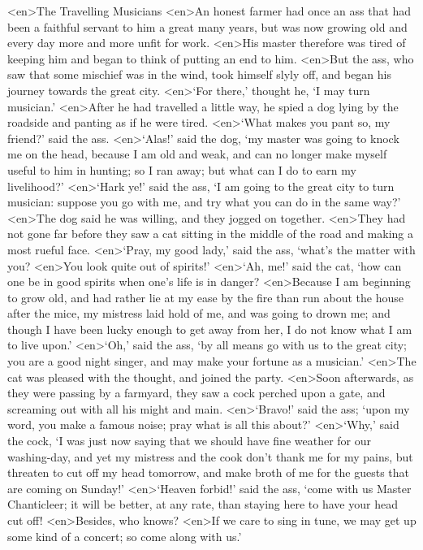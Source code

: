 <en>The Travelling Musicians 
<en>An honest farmer had once an ass that had been a faithful servant to him a great many years, but was now growing old and every day more and more unfit for work.
<en>His master therefore was tired of keeping him and began to think of putting an end to him.
<en>But the ass, who saw that some mischief was in the wind, took himself slyly off, and began his journey towards the great city.
<en>‘For there,’ thought he, ‘I may turn musician.’ 
<en>After he had travelled a little way, he spied a dog lying by the roadside and panting as if he were tired.
<en>‘What makes you pant so, my friend?’ said the ass.
<en>‘Alas!’ said the dog, ‘my master was going to knock me on the head, because I am old and weak, and can no longer make myself useful to him in hunting; so I ran away; but what can I do to earn my livelihood?’ 
<en>‘Hark ye!’ said the ass, ‘I am going to the great city to turn musician: suppose you go with me, and try what you can do in the same way?’ 
<en>The dog said he was willing, and they jogged on together.
<en>They had not gone far before they saw a cat sitting in the middle of the road and making a most rueful face.
<en>‘Pray, my good lady,’ said the ass, ‘what’s the matter with you?
<en>You look quite out of spirits!’ 
<en>‘Ah, me!’ said the cat, ‘how can one be in good spirits when one’s life is in danger?
<en>Because I am beginning to grow old, and had rather lie at my ease by the fire than run about the house after the mice, my mistress laid hold of me, and was going to drown me; and though I have been lucky enough to get away from her, I do not know what I am to live upon.’ 
<en>‘Oh,’ said the ass, ‘by all means go with us to the great city; you are a good night singer, and may make your fortune as a musician.’ 
<en>The cat was pleased with the thought, and joined the party.
<en>Soon afterwards, as they were passing by a farmyard, they saw a cock perched upon a gate, and screaming out with all his might and main.
<en>‘Bravo!’ said the ass; ‘upon my word, you make a famous noise; pray what is all this about?’ 
<en>‘Why,’ said the cock, ‘I was just now saying that we should have fine weather for our washing-day, and yet my mistress and the cook don’t thank me for my pains, but threaten to cut off my head tomorrow, and make broth of me for the guests that are coming on Sunday!’ 
<en>‘Heaven forbid!’ said the ass, ‘come with us Master Chanticleer; it will be better, at any rate, than staying here to have your head cut off!
<en>Besides, who knows?
<en>If we care to sing in tune, we may get up some kind of a concert; so come along with us.’ 
